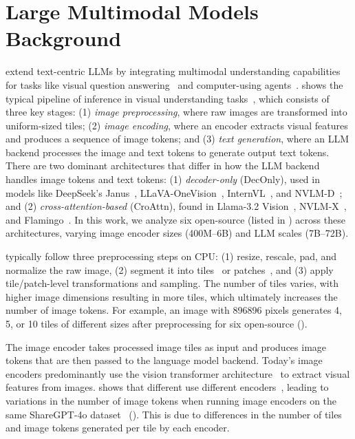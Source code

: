 \section{Large Multimodal Models Background}
\label{sec:background:lmm}

\lmms{} extend text-centric LLMs by integrating multimodal understanding capabilities for tasks like visual question answering~\cite{shao2023prompting} and computer-using agents~\cite{cua2025,niu2024screenagent}.
 shows the typical pipeline of \lmm{} inference in visual understanding tasks~\cite{ittt}, which consists of three key stages: (1) \emph{image preprocessing}, where raw images are transformed into uniform-sized tiles; (2) \emph{image encoding}, where an encoder extracts visual features and produces a sequence of image tokens; and (3) \emph{text generation}, where an LLM backend processes the image and text tokens to generate output text tokens.
There are two dominant \lmm{} architectures that differ in how the LLM backend handles image tokens and text tokens:
(1) \emph{decoder-only} (DecOnly), used in models like DeepSeek's Janus~\cite{janus}, LLaVA-OneVision~\cite{llava-ov}, InternVL~\cite{chen2024internvl}, and NVLM-D~\cite{nvlm}; and (2) \emph{cross-attention-based} (CroAttn), found in Llama-3.2 Vision~\cite{llama3}, NVLM-X~\cite{nvlm}, and Flamingo~\cite{alayrac2022flamingo}.
In this work, we analyze six open-source \lmms{} (listed in ) across these architectures, varying image encoder sizes (400M–6B) and LLM scales (7B–72B).





\lmms{} typically follow three preprocessing steps on CPU:
(1) resize, rescale, pad, and normalize the raw image, (2) segment it into tiles~\cite{llama3,nvlm,chen2024internvl} or patches~\cite{llava-ov}, and (3) apply tile/patch-level transformations and sampling.
The number of tiles varies, with higher image dimensions resulting in more tiles, which ultimately increases the number of image tokens.
For example, an image with 896\texttimes{}896 pixels generates 4, 5, or 10 tiles of different sizes after preprocessing for six open-source \lmms{} ().

The image encoder takes processed image tiles as input and produces image tokens that are then passed to the language model backend.
Today's image encoders predominantly use the vision transformer architecture~\cite{alexey2020image} to extract visual features from images.
 shows that different \lmms{} use different encoders~\cite{llava-ov,alexey2020image,zhai_sigmoid_2023,chen2024internvl}, leading to variations in the number of image tokens when running image encoders on the same ShareGPT-4o dataset~\cite{chen2024far} ().
This is due to differences in the number of tiles and image tokens generated per tile by each encoder.

